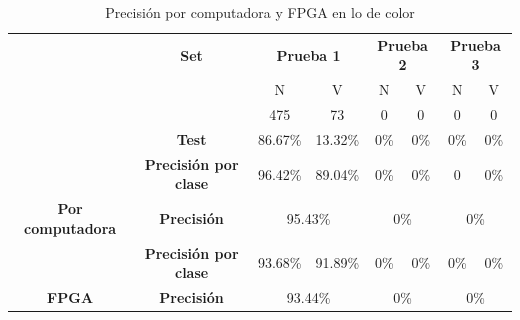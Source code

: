 \documentclass[twoside,spanish,ESP,MSc]{plantillaLabUPV}
\theoremstyle{definition}
\begin{document}

\begin{table}[h]
	\caption{Precisión por computadora y FPGA en lo de color}
	\label{imadatcol}
	\centering
\begin{tabular}{c|c|c|c|c|c|c|c|}
	\cline{2-8}
	& \textbf{Set}                    & \multicolumn{2}{c|}{\textbf{Prueba 1}}              & \multicolumn{2}{c|}{\textbf{Prueba 2}}              & \multicolumn{2}{c|}{\textbf{Prueba 3}}              \\ \cline{2-8} 
	&                                 & {\color[HTML]{F56B00} N} & {\color[HTML]{009901} V} & {\color[HTML]{F56B00} N} & {\color[HTML]{009901} V} & {\color[HTML]{F56B00} N} & {\color[HTML]{009901} V} \\ \cline{3-8} 
	&                                 & 475                      & 73                       & 0                        & 0                        & 0                        & 0                        \\ \cline{3-8} 
	& \multirow{-3}{*}{\textbf{Test}} & 86.67\%                  & 13.32\%                  & 0\%                      & 0\%                      & 0\%                      & 0\%                      \\ \hline
	\multicolumn{1}{|c|}{}                                           & \textbf{Precisión por clase}    & 96.42\%                  & 89.04\%                  & 0\%                      & 0\%                      & 0                        & 0\%                      \\ \cline{2-8} 
	\multicolumn{1}{|c|}{\multirow{-2}{*}{\textbf{Por computadora}}} & \textbf{Precisión}              & \multicolumn{2}{c|}{95.43\%}                        & \multicolumn{2}{c|}{0\%}                            & \multicolumn{2}{c|}{0\%}                            \\ \hline
	\multicolumn{1}{|c|}{}                                           & \textbf{Precisión por clase}    & 93.68\%                  & 91.89\%                  & 0\%                      & 0\%                      & 0\%                      & 0\%                      \\ \cline{2-8} 
	\multicolumn{1}{|c|}{\multirow{-2}{*}{\textbf{FPGA}}}            & \textbf{Precisión}              & \multicolumn{2}{c|}{93.44\%}                        & \multicolumn{2}{c|}{0\%}                            & \multicolumn{2}{c|}{0\%}                            \\ \hline
\end{tabular}
\end{table}
\end{document}
